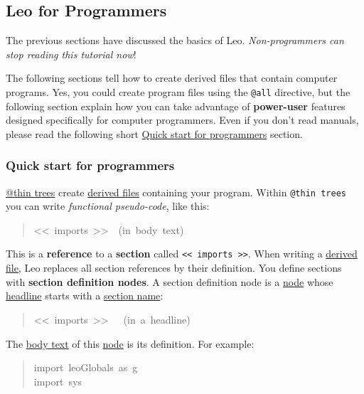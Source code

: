 \documentclass[10pt,a4paper,english]{article}
\begin{document}
\subsection*{Leo for Programmers}

The previous sections have discussed the basics of Leo.
\emph{Non-programmers can stop reading this tutorial now}!

The following sections tell how to create derived files that contain computer
programs. Yes, you could create program files using the \texttt{@all} directive, but
the following section explain how you can take advantage of \textbf{power-user}
features designed specifically for computer programmers. Even if you don't read
manuals, please read the following short \href{\#quick-start-for-programmers}{Quick start for programmers} section.



\hypertarget{quick-start-for-programmers}{}
\subsubsection*{Quick start for programmers}

\href{glossary.html\#thin-trees}{@thin trees} create \href{\#derived-files}{derived files} containing your program.
Within \texttt{@thin trees} you can write \emph{functional pseudo-code}, like this:
\begin{quote}{\ttfamily \raggedright \noindent
<{}<~imports~>{}>~~(in~body~text)
}\end{quote}

This is a \textbf{reference} to a \textbf{section} called \texttt{<{}< imports >{}>}.
When writing a \href{\#derived-files}{derived file},
Leo replaces all section references by their definition.
You define sections with \textbf{section definition nodes}.
A section definition node is a \href{glossary.html\#node}{node} whose \href{glossary.html\#headline}{headline} starts with a \href{glossary.html\#section-name}{section name}:
\begin{quote}{\ttfamily \raggedright \noindent
<{}<~imports~>{}>~~~(in~a~headline)
}\end{quote}

The \href{glossary.html\#body-text}{body text} of this \href{glossary.html\#node}{node} is its definition.  For example:
\begin{quote}{\ttfamily \raggedright \noindent
import~leoGlobals~as~g~\\
import~sys
}\end{quote}
\end{document}
